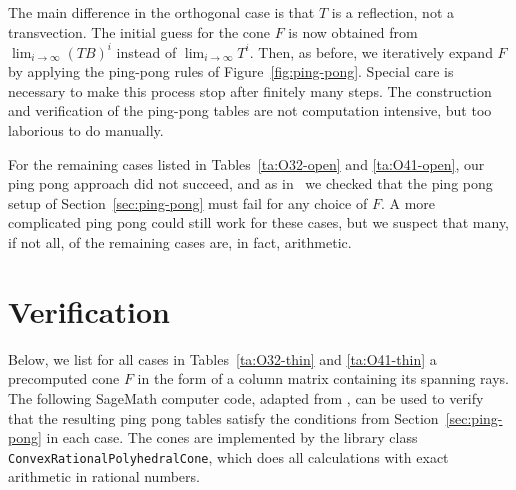\documentclass[11pt,a4paper]{amsart}
\theoremstyle{definition}
\theoremstyle{definition}
\numberwithin{equation}{section}
\begin{document}
The main difference in the orthogonal case is that $T$ is a reflection, not a transvection. The initial guess for the cone $F$ is now obtained from $\lim_{i\to\infty}(TB)^i$ instead of $\lim_{i\to\infty}T^i$. Then, as before, we iteratively expand $F$ by applying the ping-pong rules of Figure~\ref{fig:ping-pong}. Special care is necessary to make this process stop after finitely many steps.
The construction and verification of the ping-pong tables are not computation intensive, but too laborious to do manually.

For the remaining cases listed in Tables~\ref{ta:O32-open} and \ref{ta:O41-open}, our ping pong approach did not succeed, and as in~\cite{BDN21} we checked that the ping pong setup of Section~\ref{sec:ping-pong} must fail for any choice of $F$.
A more complicated ping pong could still work for these cases, but we suspect that many, if not all, of the remaining cases are, in fact, arithmetic.


\section{Verification}

Below, we list for all cases in Tables~\ref{ta:O32-thin} and \ref{ta:O41-thin} a precomputed cone $F$ in the form of a column matrix containing its spanning rays.
The following SageMath computer code, adapted from \cite{BDN21}, can be used to verify that the resulting ping pong tables satisfy the conditions from Section~\ref{sec:ping-pong} in each case.
The cones are implemented by the library class \verb|ConvexRationalPolyhedralCone|, which does all calculations with exact arithmetic in rational numbers.
\end{document}
